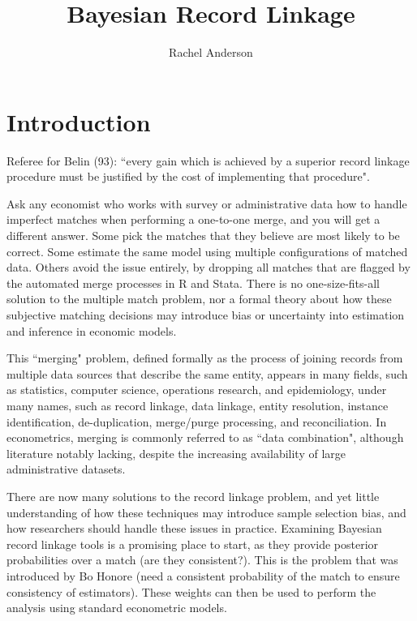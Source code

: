 \documentclass[11pt,reqno]{amsart}
\title{Bayesian Record Linkage}
\author{Rachel Anderson}
\begin{document}
\vspace*{-1cm}
\maketitle

\section{Introduction}

Referee for Belin (93): ``every gain which is achieved by a superior record linkage procedure must be justified by the cost of implementing that procedure". 

Ask any economist who works with survey or administrative data how to handle imperfect matches when performing a one-to-one merge, and you will get a different answer.  Some pick the matches that they believe are most likely to be correct.  Some estimate the same model using multiple configurations of matched data.  Others avoid the issue entirely, by dropping all matches that are flagged by the automated merge processes in R and Stata.  There is no one-size-fits-all solution to the multiple match problem, nor a formal theory about how these subjective matching decisions may introduce bias or uncertainty into estimation and inference in economic models. 

This ``merging" problem, defined formally as the process of joining records from multiple data sources that describe the same entity, appears in many fields, such as statistics, computer science, operations research, and epidemiology, under many names, such as record linkage, data linkage, entity resolution, instance identification, de-duplication, merge/purge processing, and reconciliation.    In econometrics, merging is commonly referred to as ``data combination", although literature notably lacking, despite the increasing availability of large administrative datasets.  %

There are now many solutions to the record linkage problem, and yet little understanding of how these techniques may introduce sample selection bias, and how researchers should handle these issues in practice.  Examining Bayesian record linkage tools is a promising place to start, as they provide posterior probabilities over a match (are they consistent?).  This is the problem that was introduced by Bo Honore (need a consistent probability of the match to ensure consistency of estimators).  These weights can then be used to perform the analysis using standard econometric models. 
\end{document}
